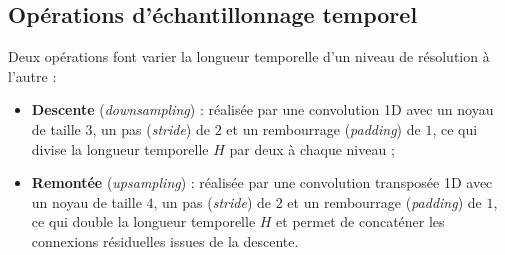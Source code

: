 \subsection*{Opérations d'échantillonnage temporel}
Deux opérations font varier la longueur temporelle d'un niveau de résolution à l'autre :
\begin{itemize}
  \item \textbf{Descente} (\textit{downsampling}) : réalisée par une convolution 1D avec un noyau de taille $3$, un pas (\textit{stride}) de $2$ et un rembourrage (\textit{padding}) de $1$, ce qui divise la longueur temporelle $H$ par deux à chaque niveau ;
  \item \textbf{Remontée} (\textit{upsampling}) : réalisée par une convolution transposée 1D avec un noyau de taille $4$, un pas (\textit{stride}) de $2$ et un rembourrage (\textit{padding}) de $1$, ce qui double la longueur temporelle $H$ et permet de concaténer les connexions résiduelles issues de la descente.
\end{itemize}
